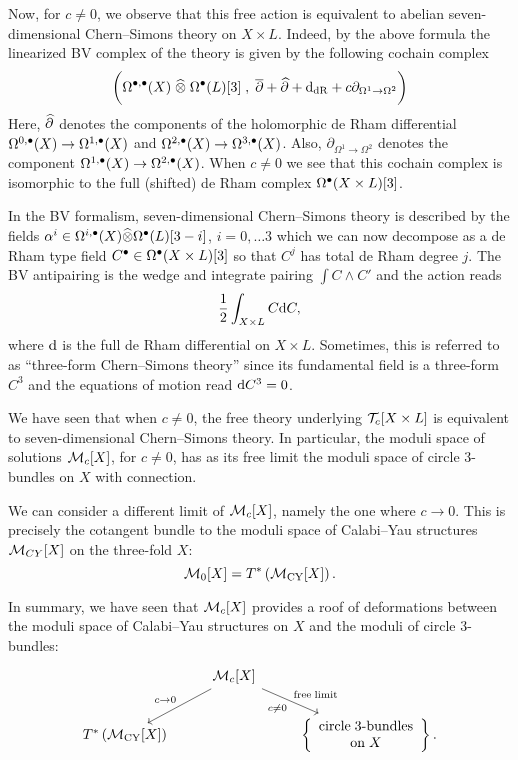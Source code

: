 \documentclass[11pt]{amsart}
\begin{document}
Now, for $c \ne 0$, we observe that this free action is equivalent to abelian seven-dimensional Chern--Simons theory on $X \times L$.
Indeed, by the above formula the linearized BV complex of the theory is given by the following cochain complex
\[
  \bigg(\Omega^{\bu, \bu} (X) \; \Hat{\otimes} \; \Omega^{\bu}(L) [3] \; , \; \dbar + \Hat{\partial} + \d_{\rm dR} + c \partial_{\Omega^{1} \to \Omega^{2}} \bigg)
\]
Here, $\Hat{\partial}$ denotes the components of the holomorphic de Rham differential $\Omega^{0,\bu}(X) \to \Omega^{1,\bu}(X)$ and $\Omega^{2,\bu}(X) \to \Omega^{3,\bu}(X)$.
Also, $\partial_{\Omega^1 \to \Omega^2}$ denotes the component $\Omega^{1,\bu}(X) \to \Omega^{2,\bu}(X)$.
When $c \ne 0$ we see that this cochain complex is isomorphic to the full (shifted) de Rham complex $\Omega^\bu(X \times L)[3]$.

In the BV formalism, seven-dimensional Chern--Simons theory is described by the fields $\alpha^i \in \Omega^{i,\bu}(X) \Hat{\otimes} \Omega^\bu(L)[3-i]$, $i=0, \ldots 3$ which we can now decompose as a de Rham type field $C^\bu \in \Omega^\bu(X \times L)[3]$ so that $C^j$ has total de Rham degree $j$.
The BV antipairing is the wedge and integrate pairing $\int C \wedge C'$ and the action reads
\[
  \frac{1}{2} \int_{X \times L} C \d C,
\]
where $\d$ is the full de Rham differential on $X \times L$.
Sometimes, this is referred to as ``three-form Chern--Simons theory'' since its fundamental field is a three-form $C^3$ and the equations of motion read $\d C^3 = 0$.

We have seen that when $c \ne 0$, the free theory underlying $\cT_c[X \times L]$ is equivalent to seven-dimensional Chern--Simons theory.
In particular, the moduli space of solutions $\cM_c[X]$, for $c \ne 0$, has as its free limit the moduli space of circle $3$-bundles on $X$ with connection.

We can consider a different limit of $\cM_c[X]$, namely the one where $c \to 0$.
This is precisely the cotangent bundle to the moduli space of Calabi--Yau structures $\cM_{CY}[X]$ on the three-fold $X$:
\[
  \cM_0[X] = T^* \left(\cM_{\rm CY} [X]\right) .
\]

In summary, we have seen that $\cM_c[X]$ provides a roof of deformations between the moduli space of Calabi--Yau structures on $X$ and the moduli of circle $3$-bundles:
\[
  \begin{tikzcd}
    & \cM_c[X] \ar[dr, "c \ne 0"', "{\rm free\;limit}"] \ar[dl, "c \to 0"'] & \\ T^* \left(\cM_{\rm CY} [X] \right) & & \left\{ \begin{array}{ccc} \mbox{circle\;3-bundles} \\ {\rm on} \; X \end{array} \right\} .
  \end{tikzcd}
\]
\end{document}
